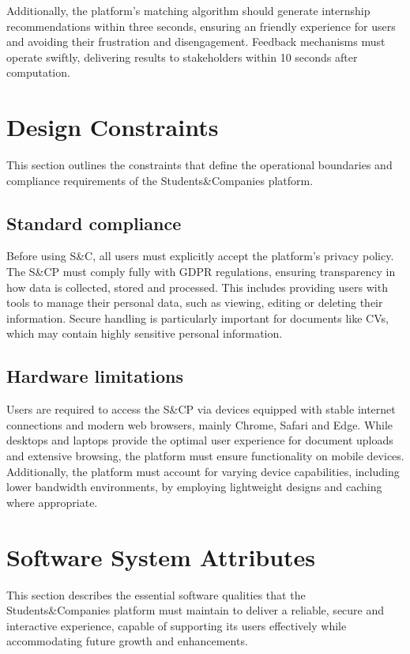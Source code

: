 Additionally, the platform's matching algorithm should generate internship recommendations within three seconds, ensuring an friendly experience for users and avoiding their frustration and disengagement.
Feedback mechanisms must operate swiftly, delivering results to stakeholders within 10 seconds after computation.

\section{Design Constraints}
This section outlines the constraints that define the operational boundaries and compliance requirements of the Students\&Companies platform.

\subsection{Standard compliance}
Before using S\&C, all users must explicitly accept the platform's privacy policy.
The S\&CP must comply fully with GDPR regulations, ensuring transparency in how data is collected, stored and processed.
This includes providing users with tools to manage their personal data, such as viewing, editing or deleting their information.
Secure handling is particularly important for documents like CVs, which may contain highly sensitive personal information.

\subsection{Hardware limitations}
Users are required to access the S\&CP via devices equipped with stable internet connections and modern web browsers, mainly Chrome, Safari and Edge.
While desktops and laptops provide the optimal user experience for document uploads and extensive browsing, the platform must ensure functionality on mobile devices.
Additionally, the platform must account for varying device capabilities, including lower bandwidth environments, by employing lightweight designs and caching where appropriate.

\section{Software System Attributes}
This section describes the essential software qualities that the Students\&Companies platform must maintain to deliver a reliable, secure and interactive experience, capable of supporting its users effectively while accommodating future growth and enhancements.

